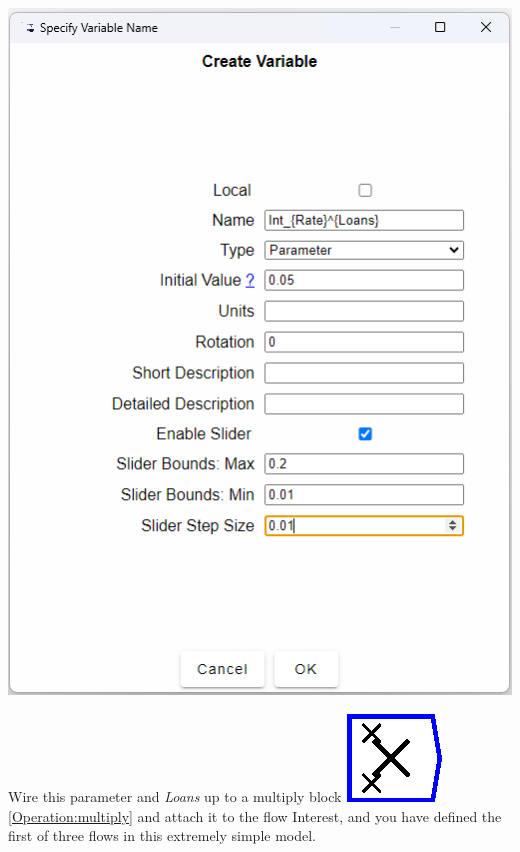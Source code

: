 \includegraphics{images/MonetaryModel01GodleyTable05DefineFlows03}

Wire this parameter and \emph{Loans }up to a multiply block \includegraphics{images/multiply}\ref{Operation:multiply}
and attach it to the flow Interest, and you have defined the first
of three flows in this extremely simple model.

